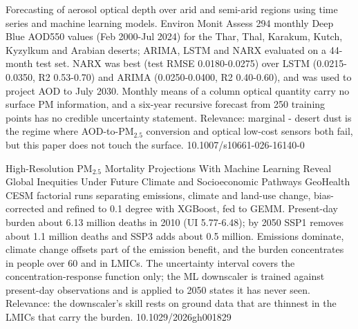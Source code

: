\documentclass[10pt]{article}
\begin{document}
{Forecasting of aerosol optical depth over arid and semi-arid regions using time series and machine learning models.}
{Environ Monit Assess}
{294 monthly Deep Blue AOD550 values (Feb 2000-Jul 2024) for the Thar, Thal, Karakum, Kutch, Kyzylkum and Arabian deserts; ARIMA, LSTM and NARX evaluated on a 44-month test set. NARX was best (test RMSE 0.0180-0.0275) over LSTM (0.0215-0.0350, R2 0.53-0.70) and ARIMA (0.0250-0.0400, R2 0.40-0.60), and was used to project AOD to July 2030. Monthly means of a column optical quantity carry no surface PM information, and a six-year recursive forecast from 250 training points has no credible uncertainty statement. Relevance: marginal - desert dust is the regime where AOD-to-PM$_{2.5}$ conversion and optical low-cost sensors both fail, but this paper does not touch the surface.}
{10.1007/s10661-026-16140-0}

\par{}\baselineskip{}\baselineskip
{}

{High-Resolution PM$_{2.5}$ Mortality Projections With Machine Learning Reveal Global Inequities Under Future Climate and Socioeconomic Pathways}
{GeoHealth}
{CESM factorial runs separating emissions, climate and land-use change, bias-corrected and refined to 0.1 degree with XGBoost, fed to GEMM. Present-day burden about 6.13 million deaths in 2010 (UI 5.77-6.48); by 2050 SSP1 removes about 1.1 million deaths and SSP3 adds about 0.5 million. Emissions dominate, climate change offsets part of the emission benefit, and the burden concentrates in people over 60 and in LMICs. The uncertainty interval covers the concentration-response function only; the ML downscaler is trained against present-day observations and is applied to 2050 states it has never seen. Relevance: the downscaler's skill rests on ground data that are thinnest in the LMICs that carry the burden.}
{10.1029/2026gh001829}
\end{document}
